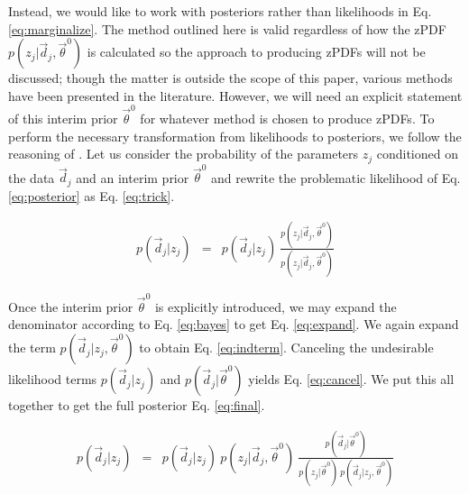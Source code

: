 \documentclass[preprint]{aastex}
\begin{document}
Instead, we would like to work with posteriors rather than likelihoods in Eq. \ref{eq:marginalize}.  The method outlined here is valid regardless of how the zPDF $p(z_{j}|\vec{d}_{j},\vec{\theta}^{0})$ is calculated so the approach to producing zPDFs will not be discussed; though the matter is outside the scope of this paper, various methods have been presented in the literature. \citep{she11, bal08, car13, car14a}  However, we will need an explicit statement of this interim prior $\vec{\theta}^{0}$ for whatever method is chosen to produce zPDFs.  To perform the necessary transformation from likelihoods to posteriors, we follow the reasoning of \citet{mar15}.  Let us consider the probability of the parameters $z_{j}$ conditioned on the data $\vec{d}_{j}$ and an interim prior $\vec{\theta}^{0}$ and rewrite the problematic likelihood of Eq. \ref{eq:posterior} as Eq. \ref{eq:trick}.  

\begin{eqnarray}
\label{eq:trick}
p(\vec{d}_{j}|z_{j}) &=& p(\vec{d}_{j}|z_{j})\ \frac{p(z_{j}|\vec{d}_{j},\vec{\theta}^{0})}{p(z_{j}|\vec{d}_{j},\vec{\theta}^{0})}
\end{eqnarray}

Once the interim prior $\vec{\theta}^{0}$ is explicitly introduced, we may expand the denominator according to Eq. \ref{eq:bayes} to get Eq. \ref{eq:expand}.  We again expand the term $p(\vec{d}_{j}|z_{j},\vec{\theta}^{0})$ to obtain Eq. \ref{eq:indterm}.  Canceling the undesirable likelihood terms $p(\vec{d}_{j}|z_{j})$ and $p(\vec{d}_{j}|\vec{\theta}^{0})$ yields Eq. \ref{eq:cancel}.  We put this all together to get the full posterior Eq. \ref{eq:final}.

\begin{eqnarray}
\label{eq:expand}
p(\vec{d}_{j}|z_{j}) &=& p(\vec{d}_{j}|z_{j})\ p(z_{j}|\vec{d}_{j},\vec{\theta}^{0})\ \frac{p(\vec{d}_{j}|\vec{\theta}^{0})}{p(z_{j}|\vec{\theta}^{0})\ p(\vec{d}_{j}|z_{j},\vec{\theta}^{0})}
\end{eqnarray}
\end{document}
